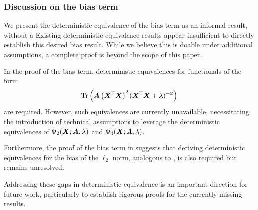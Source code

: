 \subsubsection{Discussion on the bias term}\label{app:discuss_bias}

We present the deterministic equivalence of the bias term as an informal result, without a Existing deterministic equivalence results appear insufficient to directly establish this desired bias result. While we believe this is doable under  additional assumptions, a complete proof is beyond the scope of this paper..

In the proof of the bias term, deterministic equivalences for functionals of the form 
\[
{\rm Tr} \left( {\boldsymbol A} \left( {\boldsymbol X}^{\mathsf T} {\boldsymbol X} \right)^2 ({\boldsymbol X}^{\mathsf T} {\boldsymbol X} + \lambda)^{-2} \right)
\]
are required. However, such equivalences are currently unavailable, necessitating the introduction of technical assumptions to leverage the deterministic equivalences of \(\Phi_2({\boldsymbol X}; {\boldsymbol A}, \lambda)\) and \(\Phi_4({\boldsymbol X}; {\boldsymbol A}, \lambda)\).

Furthermore, the proof of the bias term in \cite{defilippis2024dimension} suggests that deriving deterministic equivalences for the bias of the \(\ell_2\) norm, analogous to \citet[Proposition B.7]{defilippis2024dimension}, is also required but remains unresolved.

Addressing these gaps in deterministic equivalence is an important direction for future work, particularly to establish rigorous proofs for the currently missing results.

